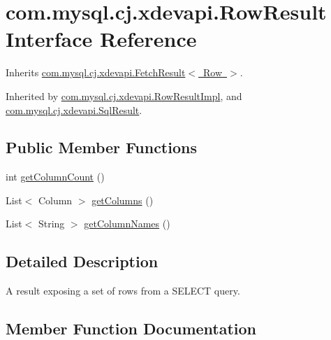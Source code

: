 \hypertarget{interfacecom_1_1mysql_1_1cj_1_1xdevapi_1_1_row_result}{}\section{com.\+mysql.\+cj.\+xdevapi.\+Row\+Result Interface Reference}
\label{interfacecom_1_1mysql_1_1cj_1_1xdevapi_1_1_row_result}


Inherits \mbox{\hyperlink{interfacecom_1_1mysql_1_1cj_1_1xdevapi_1_1_fetch_result}{com.\+mysql.\+cj.\+xdevapi.\+Fetch\+Result$<$ Row $>$}}.



Inherited by \mbox{\hyperlink{classcom_1_1mysql_1_1cj_1_1xdevapi_1_1_row_result_impl}{com.\+mysql.\+cj.\+xdevapi.\+Row\+Result\+Impl}}, and \mbox{\hyperlink{interfacecom_1_1mysql_1_1cj_1_1xdevapi_1_1_sql_result}{com.\+mysql.\+cj.\+xdevapi.\+Sql\+Result}}.

\subsection*{Public Member Functions}
\begin{DoxyCompactItemize}
\item 
int \mbox{\hyperlink{interfacecom_1_1mysql_1_1cj_1_1xdevapi_1_1_row_result_aaf66f729c7c99e7ceb90ea49c4631ef0}{get\+Column\+Count}} ()
\item 
List$<$ Column $>$ \mbox{\hyperlink{interfacecom_1_1mysql_1_1cj_1_1xdevapi_1_1_row_result_a4bd495dadd5549516c0f32366f8d77c7}{get\+Columns}} ()
\item 
List$<$ String $>$ \mbox{\hyperlink{interfacecom_1_1mysql_1_1cj_1_1xdevapi_1_1_row_result_acbc412c859e4618f3b924c602a82f541}{get\+Column\+Names}} ()
\end{DoxyCompactItemize}


\subsection{Detailed Description}
A result exposing a set of rows from a S\+E\+L\+E\+CT query. 

\subsection{Member Function Documentation}
\mbox{\label{interfacecom_1_1mysql_1_1cj_1_1xdevapi_1_1_row_result_aaf66f729c7c99e7ceb90ea49c4631ef0}} 
